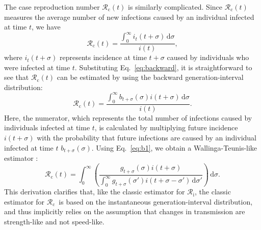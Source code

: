 \documentclass[12pt]{article}
\newcommand{\comment}{\showcomment}
\newcommand{\showcomment}[3]{\textcolor{#1}{\textbf{[#2: }\textsl{#3}\textbf{]}}}
\newcommand{\jd}[1]{\comment{cyan}{JD}{#1}}
\newcommand{\eref}[1]{Eq.~\ref{eq:#1}}
\newcommand{\Rx}[1]{\ensuremath{{\mathcal R}_{#1}}\xspace}
\newcommand{\Rc}{\Rx{\mathrm{c}}}
\newcommand{\Ri}{\Rx{\mathrm{i}}}
\newcommand{\dd}[1]{\ensuremath{\, \mathrm{d}#1}}
\newcommand{\dsigma}{\dd{\sigma}}
\begin{document}
The case reproduction number $\Rc(t)$ is similarly complicated. 
Since $\Rc(t)$ measures the average number of new infections caused by an individual infected at time $t$, we have
\begin{equation}
\Rc(t) = \frac{\int_0^\infty i_t(t+\sigma) \dsigma}{i(t)},
\end{equation}
where $i_t(t+\sigma)$ represents incidence at time $t+\sigma$ caused by individuals who were infected at time $t$.
Substituting \eref{backward}, it is straightforward to see that $\Rc(t)$ can be estimated by using the backward generation-interval distribution:
\begin{equation}
\Rc(t) = \frac{\int_0^\infty b_{t+\sigma}(\sigma) i(t+\sigma) \dsigma}{i(t)}.
\end{equation}
Here, the numerator, which represents the total number of infections caused by individuals infected at time $t$, is calculated by multiplying future incidence $i(t+\sigma)$ with the probability that future infections are caused by an individual infected at time $t$ $b_{t+\sigma}(\sigma)$.
Using \eref{b1}, we obtain a Wallinga-Teunis-like estimator \citep{wallinga2004different}:
\begin{equation}
\Rc(t) = \int_0^\infty \left(\frac{g_{t+\sigma}(\sigma) i(t+\sigma)}{\int_0^\infty g_{t+\sigma}(\sigma') i(t+\sigma-\sigma') \dsigma'} \right) \dsigma.
\label{eq:wtlike}
\end{equation}
This derivation clarifies that, like the classic estimator for \Ri, the classic estimator for \Rc\ is based on the instantaneous generation-interval distribution, and thus implicitly relies on the assumption that changes in transmission are strength-like and not speed-like.

\end{document}
